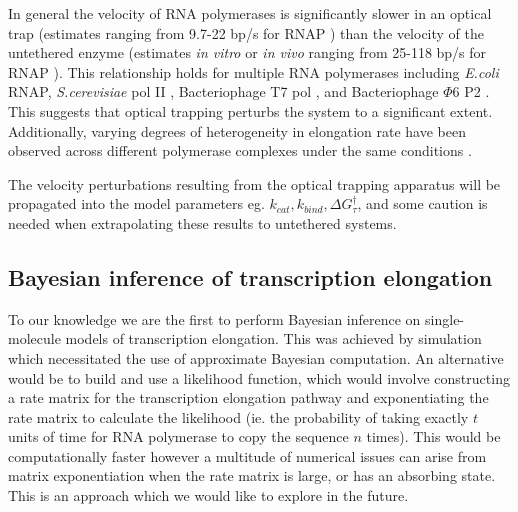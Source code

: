\documentclass[10pt,letterpaper]{article}
\begin{document}
In general the velocity of RNA polymerases is significantly slower in an optical trap (estimates ranging from 9.7-22 bp/s for RNAP \cite{neuman2003ubiquitous, davenport2000single, tolic2004diversity, mejia2015trigger, mejia2008thermal}) than the velocity of the untethered enzyme (estimates {\it in vitro} or {\it in vivo} ranging from 25-118 bp/s for RNAP \cite{iost1992bacteriophage, vogel1994rna, burns1998combinatorial, kingston1981direct}). This relationship holds for multiple RNA polymerases including \textit{E.coli} RNAP, \textit{S.cerevisiae} pol II \cite{galburt2009single, larson2012trigger, Dangkulwanich2013complete, kireeva2008transient}, Bacteriophage T7 pol \cite{skinner2004promoter, thomen2008t7, iost1992bacteriophage, anand2006transient}, and Bacteriophage $\Phi 6$ P2 \cite{dulin2015elongation, usala1980displacement}. This suggests that optical trapping perturbs the system to a significant extent. Additionally, varying degrees of heterogeneity in elongation rate have been observed across different polymerase complexes under the same conditions \cite{tolic2004diversity, neuman2003ubiquitous, thomen2008t7}. \par

The velocity perturbations resulting from the optical trapping apparatus will be propagated into the model parameters eg. $k_{cat}, k_{bind}, \Delta G^\dag_\tau$, and some caution is needed when extrapolating these results to untethered systems.   





\subsection*{Bayesian inference of transcription elongation} To our knowledge we are the first to perform Bayesian inference on single-molecule models of transcription elongation. This was achieved by simulation which necessitated the use of approximate Bayesian computation. An alternative would be to build and use a likelihood function, which would involve constructing a rate matrix for the transcription elongation pathway and exponentiating the rate matrix to calculate the likelihood (ie. the probability of taking exactly $t$ units of time for RNA polymerase to copy the sequence $n$ times). This would be computationally faster however a multitude of numerical issues can arise from matrix exponentiation when the rate matrix is large, or has an absorbing state. This is an approach which we would like to explore in the future. \par
\end{document}
